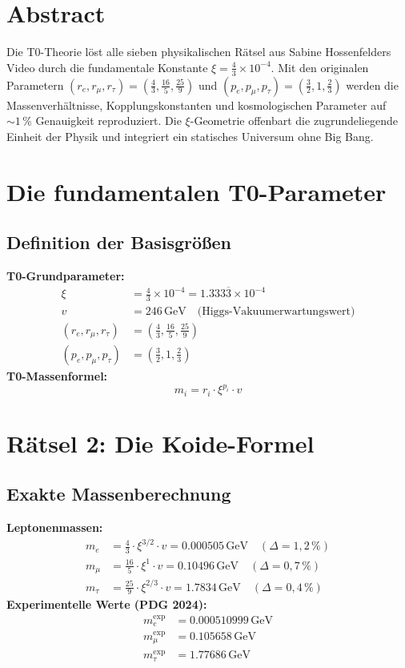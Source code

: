 \section*{Abstract}
		Die T0-Theorie löst alle sieben physikalischen Rätsel aus Sabine Hossenfelders Video durch die fundamentale Konstante $\xi = \frac{4}{3} \times 10^{-4}$. Mit den originalen Parametern $(r_e, r_\mu, r_\tau) = (\frac{4}{3}, \frac{16}{5}, \frac{25}{9})$ und $(p_e, p_\mu, p_\tau) = (\frac{3}{2}, 1, \frac{2}{3})$ werden die Massenverhältnisse, Kopplungskonstanten und kosmologischen Parameter auf $\sim 1\,\%$ Genauigkeit reproduziert. Die $\xi$-Geometrie offenbart die zugrundeliegende Einheit der Physik und integriert ein statisches Universum ohne Big Bang.

	\section{Die fundamentalen T0-Parameter}
	\subsection{Definition der Basisgrößen}
	\textbf{T0-Grundparameter:}
	\begin{align}
		\xi &= \frac{4}{3} \times 10^{-4} = 1.333\overline{3} \times 10^{-4} \\
		v &= 246\,\si{\giga\electronvolt} \quad \text{(Higgs-Vakuumerwartungswert)} \\
		(r_e, r_\mu, r_\tau) &= \left(\frac{4}{3}, \frac{16}{5}, \frac{25}{9}\right) \\
		(p_e, p_\mu, p_\tau) &= \left(\frac{3}{2}, 1, \frac{2}{3}\right)
	\end{align}
	\textbf{T0-Massenformel:}
	\begin{equation}
		m_i = r_i \cdot \xi^{p_i} \cdot v
	\end{equation}
	\section{Rätsel 2: Die Koide-Formel}
	\subsection{Exakte Massenberechnung}
	\textbf{Leptonenmassen:}
	\begin{align}
		m_e &= \frac{4}{3} \cdot \xi^{3/2} \cdot v = 0.000505\,\si{\giga\electronvolt} \quad (\Delta = 1{,}2\,\%) \\
		m_\mu &= \frac{16}{5} \cdot \xi^{1} \cdot v = 0.10496\,\si{\giga\electronvolt} \quad (\Delta = 0{,}7\,\%) \\
		m_\tau &= \frac{25}{9} \cdot \xi^{2/3} \cdot v = 1.7834\,\si{\giga\electronvolt} \quad (\Delta = 0{,}4\,\%)
	\end{align}
	\textbf{Experimentelle Werte (PDG 2024):}
	\begin{align}
		m_e^{\text{exp}} &= 0.000510999\,\si{\giga\electronvolt} \\
		m_\mu^{\text{exp}} &= 0.105658\,\si{\giga\electronvolt} \\
		m_\tau^{\text{exp}} &= 1.77686\,\si{\giga\electronvolt}
	\end{align}
